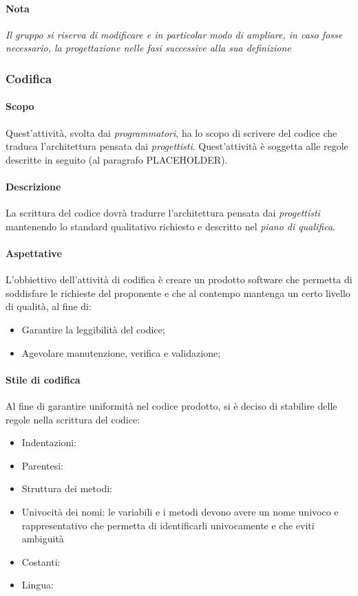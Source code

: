 \documentclass[../norme-di-progetto.tex]{subfiles}
\begin{document}
  \paragraph{Nota}
  \emph{Il gruppo si riserva di modificare e in particolar modo di ampliare, in caso fosse necessario, la progettazione nelle fasi successive alla sua definizione}
  
  \subsubsection{Codifica}
 
 \paragraph{Scopo}
    Quest'attività, svolta dai \emph{programmatori}, ha lo scopo di scrivere del codice che traduca l'architettura pensata dai \emph{progettisti}. Quest'attività è soggetta alle regole descritte in seguito (al paragrafo PLACEHOLDER).
 
 \paragraph{Descrizione}
 La scrittura del codice dovrà tradurre l'architettura pensata dai \emph{progettisti} mantenendo lo standard qualitativo richiesto e descritto nel \emph{piano di qualifica}.
 
 \paragraph{Aspettative}
 L'obbiettivo dell'attività di codifica è creare un prodotto software che permetta di soddisfare le richieste del proponente e che al contempo mantenga un certo livello di qualità, al fine di:
 \begin{itemize}
     \item Garantire la leggibilità del codice;
     \item Agevolare manutenzione, verifica e validazione;
 \end{itemize}
 
 
 \paragraph{Stile di codifica}
 Al fine di garantire uniformità nel codice prodotto, si è deciso di stabilire delle regole nella scrittura del codice:
 \begin{itemize}
     \item Indentazioni:
     \item Parentesi:
     \item Struttura dei metodi:
     \item Univocità dei nomi: le variabili e i metodi devono avere un nome univoco e rappresentativo che permetta di identificarli univocamente e che eviti ambiguità
     \item Costanti:
     \item Lingua:
 \end{itemize}
 
\end{document}
